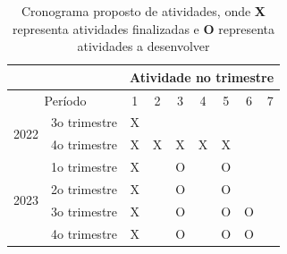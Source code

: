 
\begin{table}[!h]
\centering
\label{table:cronogramaproposta}
\caption{Cronograma proposto de atividades, onde \textbf{X} representa atividades finalizadas e \textbf{O} representa atividades a desenvolver}
\label{tab:my-table}
\begin{tabular}{ccccccccc}
\cline{3-9}
 & \multicolumn{1}{c|}{} & \multicolumn{7}{c|}{Atividade no trimestre} \\ \hline
\multicolumn{2}{|c|}{Período} & \multicolumn{1}{c|}{1} & \multicolumn{1}{c|}{2} & \multicolumn{1}{c|}{3} & \multicolumn{1}{c|}{4} & \multicolumn{1}{c|}{5} & \multicolumn{1}{c|}{6} & \multicolumn{1}{c|}{7} \\ \hline
\multicolumn{1}{|c|}{\multirow{2}{*}{2022}} & \multicolumn{1}{c|}{3o trimestre} & \multicolumn{1}{c|}{X} & \multicolumn{1}{c|}{} & \multicolumn{1}{c|}{} & \multicolumn{1}{c|}{} & \multicolumn{1}{c|}{} & \multicolumn{1}{c|}{} & \multicolumn{1}{c|}{} \\ \cline{2-9} 
\multicolumn{1}{|c|}{} & \multicolumn{1}{c|}{4o trimestre} & \multicolumn{1}{c|}{X} & \multicolumn{1}{c|}{X} & \multicolumn{1}{c|}{X} & \multicolumn{1}{c|}{X} & \multicolumn{1}{c|}{X} & \multicolumn{1}{c|}{} & \multicolumn{1}{c|}{} \\ \hline
\multicolumn{1}{|c|}{\multirow{4}{*}{2023}} & \multicolumn{1}{c|}{1o trimestre} & \multicolumn{1}{c|}{X} & \multicolumn{1}{c|}{} & \multicolumn{1}{c|}{O} & \multicolumn{1}{c|}{} & \multicolumn{1}{c|}{O} & \multicolumn{1}{c|}{} & \multicolumn{1}{c|}{} \\ \cline{2-9} 
\multicolumn{1}{|c|}{} & \multicolumn{1}{c|}{2o trimestre} & \multicolumn{1}{c|}{X} & \multicolumn{1}{c|}{} & \multicolumn{1}{c|}{O} & \multicolumn{1}{c|}{} & \multicolumn{1}{c|}{O} & \multicolumn{1}{c|}{} & \multicolumn{1}{c|}{} \\ \cline{2-9} 
\multicolumn{1}{|c|}{} & \multicolumn{1}{c|}{3o trimestre} & \multicolumn{1}{c|}{X} & \multicolumn{1}{c|}{} & \multicolumn{1}{c|}{O} & \multicolumn{1}{c|}{} & \multicolumn{1}{c|}{O} & \multicolumn{1}{c|}{O} & \multicolumn{1}{c|}{} \\ \cline{2-9} 
\multicolumn{1}{|c|}{} & \multicolumn{1}{c|}{4o trimestre} & \multicolumn{1}{c|}{X} & \multicolumn{1}{c|}{} & \multicolumn{1}{c|}{O} & \multicolumn{1}{c|}{} & \multicolumn{1}{c|}{O} & \multicolumn{1}{c|}{O} & \multicolumn{1}{c|}{} \\ \hline

\end{tabular}
\end{table}
